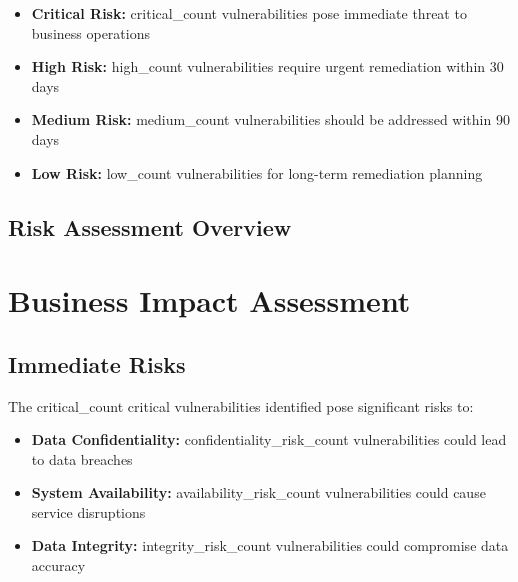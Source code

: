 \documentclass[11pt,a4paper]{article}
\begin{document}
\begin{itemize}
    \item \textbf{Critical Risk:} {{critical_count}} vulnerabilities pose immediate threat to business operations
    \item \textbf{High Risk:} {{high_count}} vulnerabilities require urgent remediation within 30 days
    \item \textbf{Medium Risk:} {{medium_count}} vulnerabilities should be addressed within 90 days
    \item \textbf{Low Risk:} {{low_count}} vulnerabilities for long-term remediation planning
\end{itemize}

\subsection{Risk Assessment Overview}

\begin{center}
\end{center}

\section{Business Impact Assessment}

\subsection{Immediate Risks}

The {{critical_count}} critical vulnerabilities identified pose significant risks to:
\begin{itemize}
    \item \textbf{Data Confidentiality:} {{confidentiality_risk_count}} vulnerabilities could lead to data breaches
    \item \textbf{System Availability:} {{availability_risk_count}} vulnerabilities could cause service disruptions
    \item \textbf{Data Integrity:} {{integrity_risk_count}} vulnerabilities could compromise data accuracy
\end{itemize}
\end{document}
